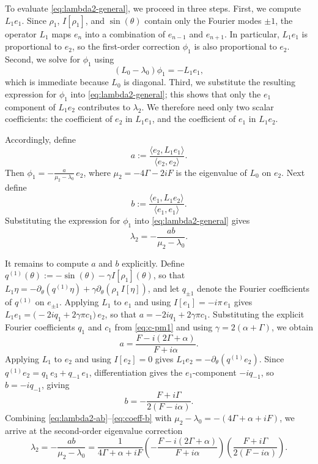 \documentclass[a4paper,11pt]{article}
\theoremstyle{plain}
\theoremstyle{definition}
\theoremstyle{remark}
\begin{document}
To evaluate \eqref{eq:lambda2-general}, we proceed in three steps. First, we compute $L_1e_1$. Since $\rho_1$, $I[\rho_1]$, and $\sin(\theta)$ contain only the Fourier modes $\pm1$, the operator $L_1$ maps $e_n$ into a combination of $e_{n-1}$ and $e_{n+1}$. In particular, $L_1e_1$ is proportional to $e_2$, so the first-order correction $\phi_1$ is also proportional to $e_2$. Second, we solve for $\phi_1$ using
\[
    (L_0-\lambda_0)\phi_1=-L_1e_1,
\]
which is immediate because $L_0$ is diagonal. Third, we substitute the resulting expression for $\phi_1$ into \eqref{eq:lambda2-general}; this shows that only the $e_1$ component of $L_1e_2$ contributes to $\lambda_2$. We therefore need only two scalar coefficients: the coefficient of $e_2$ in $L_1e_1$, and the coefficient of $e_1$ in $L_1e_2$.

Accordingly, define
\[
    a := \frac{\langle e_2, L_1 e_1\rangle}{\langle e_2, e_2\rangle}.
\]
Then $\phi_1 = -\frac{a}{\mu_2 - \lambda_0}\,e_2$, where $\mu_2 = -4\Gamma - 2iF$ is the eigenvalue of $L_0$ on $e_2$. Next define
\[
    b := \frac{\langle e_1, L_1 e_2\rangle}{\langle e_1, e_1\rangle}.
\]
Substituting the expression for $\phi_1$ into \eqref{eq:lambda2-general} gives
\begin{equation}\label{eq:lambda2-ab}
    \lambda_2 = -\frac{ab}{\mu_2 - \lambda_0}.
\end{equation}

It remains to compute $a$ and $b$ explicitly. Define $q^{(1)}(\theta) := -\sin(\theta) - \gamma I[\rho_1](\theta)$, so that $L_1\eta = -\partial_\theta(q^{(1)}\eta) + \gamma\partial_\theta(\rho_1\, I[\eta])$, and let $q_{\pm 1}$ denote the Fourier coefficients of $q^{(1)}$ on $e_{\pm 1}$. Applying $L_1$ to $e_1$ and using $I[e_1] = -i\pi\, e_1$ gives $L_1 e_1 = \big(-2iq_1 + 2\gamma\pi c_1\big)\,e_2$, so that $a = -2iq_1 + 2\gamma\pi c_1$. Substituting the explicit Fourier coefficients $q_1$ and $c_1$ from \eqref{eq:c-pm1} and using $\gamma = 2(\alpha + \Gamma)$, we obtain
\begin{equation*}\label{eq:coeff-a}
    a = \frac{F - i(2\Gamma + \alpha)}{F + i\alpha}.
\end{equation*}
Applying $L_1$ to $e_2$ and using $I[e_2] = 0$ gives $L_1 e_2 = -\partial_\theta(q^{(1)} e_2)$. Since $q^{(1)} e_2 = q_1\,e_3 + q_{-1}\,e_1$, differentiation gives the $e_1$-component $-iq_{-1}$, so $b = -iq_{-1}$, giving
\begin{equation}\label{eq:coeff-b}
    b = -\frac{F + i\Gamma}{2(F - i\alpha)}.
\end{equation}
Combining \eqref{eq:lambda2-ab}--\eqref{eq:coeff-b} with $\mu_2 - \lambda_0 = -(4\Gamma + \alpha + iF)$, we arrive at the second-order eigenvalue correction
\begin{equation}\label{eq:lambda2-formula}
    \lambda_2 = -\frac{ab}{\mu_2 - \lambda_0}
    = \frac{1}{4\Gamma + \alpha + iF}
    \left(-\frac{F - i(2\Gamma + \alpha)}{F + i\alpha}\right)
    \left(\frac{F + i\Gamma}{2(F - i\alpha)}\right).
\end{equation}
\end{document}
